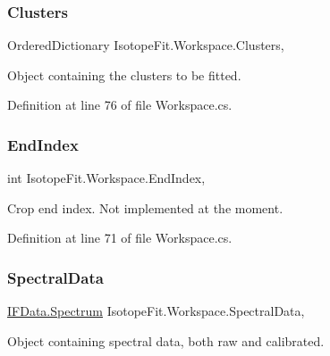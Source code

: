 \subsubsection{\texorpdfstring{Clusters}{Clusters}}
{\footnotesize\ttfamily Ordered\+Dictionary Isotope\+Fit.\+Workspace.\+Clusters\hspace{0.3cm}{\ttfamily [get]}, {\ttfamily [set]}}



Object containing the clusters to be fitted. 



Definition at line 76 of file Workspace.\+cs.

\mbox{\label{class_isotope_fit_1_1_workspace_af51c32e7bc1645aaf8a24e94c96bc013}} 
\subsubsection{\texorpdfstring{End\+Index}{EndIndex}}
{\footnotesize\ttfamily int Isotope\+Fit.\+Workspace.\+End\+Index\hspace{0.3cm}{\ttfamily [get]}, {\ttfamily [set]}}



Crop end index. Not implemented at the moment. 



Definition at line 71 of file Workspace.\+cs.

\mbox{\label{class_isotope_fit_1_1_workspace_a1d6cc2dd07cbfe920da9f1bffc9b32c2}} 
\subsubsection{\texorpdfstring{Spectral\+Data}{SpectralData}}
{\footnotesize\ttfamily \hyperlink{class_isotope_fit_1_1_i_f_data_1_1_spectrum}{I\+F\+Data.\+Spectrum} Isotope\+Fit.\+Workspace.\+Spectral\+Data\hspace{0.3cm}{\ttfamily [get]}, {\ttfamily [set]}}



Object containing spectral data, both raw and calibrated. 



